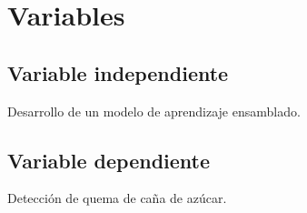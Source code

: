 \section{Variables}
\subsection{Variable independiente}
Desarrollo de un modelo de aprendizaje ensamblado.
\subsection{Variable dependiente}
Detección de quema de caña de azúcar.